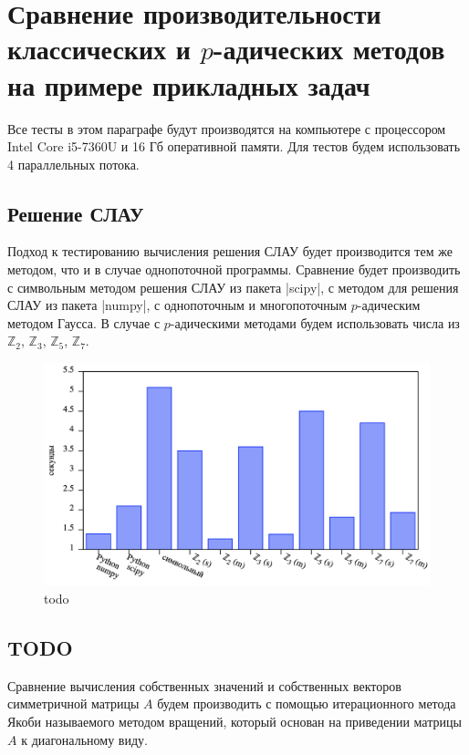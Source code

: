 \documentclass[master, och, diploma, times]{sty/SCWorks}
\theoremstyle{plain}
\theoremstyle{definition}
\begin{document}
\section{Сравнение производительности классических и $p$-адических методов на примере прикладных задач}


Все тесты в этом параграфе будут производятся на компьютере с процессором Intel Core i5-7360U и 16 Гб оперативной памяти. Для тестов будем использовать 4 параллельных потока.


\subsection{Решение СЛАУ}
Подход к тестированию вычисления решения СЛАУ будет производится тем же методом, что и в случае однопоточной программы. Сравнение будет производить с символьным методом решения СЛАУ из пакета |scipy|, с методом для решения СЛАУ из пакета |numpy|, с однопоточным и многопоточным $p$-адическим методом Гаусса. В случае с $p$-адическими методами будем использовать числа из $\mathbb{Z}_2$, $\mathbb{Z}_3$, $\mathbb{Z}_5$, $\mathbb{Z}_7$. 


\begin{figure}[H]
\centerline{\includegraphics[width=0.85\linewidth]{../gnuplot/comp/gauss/plot.png}}
\caption{todo}
\end{figure}

\subsection{TODO}
Сравнение вычисления собственных значений и собственных векторов симметричной матрицы $A$ будем производить с помощью итерационного метода Якоби называемого методом вращений, который основан на приведении матрицы $A$ к диагональному виду.
\end{document}

